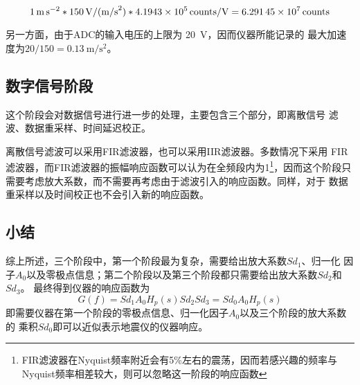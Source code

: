 \[
    \SI{1}{\m\per\square\s} *
    \SI{150}{\V\per{(\m\per\square\s)}} *
    \SI{4.1943e5}{counts\per\V} =
    \SI{6.29145e7}{counts}
\]

另一方面，由于ADC的输入电压的上限为 \SI{20}{\V}，因而仪器所能记录的
最大加速度为$20/150=\SI{0.13}{\m\per\square\s}$。

\subsection{数字信号阶段}
这个阶段会对数据信号进行进一步的处理，主要包含三个部分，即离散信号
滤波、数据重采样、时间延迟校正。

离散信号滤波可以采用FIR滤波器，也可以采用IIR滤波器。多数情况下采用
FIR滤波器，而FIR滤波器的振幅响应函数可以认为在全频段内为1\footnote{
FIR滤波器在Nyquist频率附近会有5\%左右的震荡，因而若感兴趣的频率与
Nyquist频率相差较大，则可以忽略这一阶段的响应函数}，因而这个阶段只
需要考虑放大系数，而不需要再考虑由于滤波引入的响应函数。同样，对于
数据重采样以及时间校正也不会引入新的响应函数。

\subsection{小结}
综上所述，三个阶段中，第一个阶段最为复杂，需要给出放大系数$Sd_{1}$、归一化
因子$A_0$以及零极点信息；第二个阶段以及第三个阶段都只需要给出放大系数$Sd_{2}$和$Sd_3$。
最终得到仪器的响应函数为
\[
    G(f)=Sd_1 A_0 H_p(s) Sd_2 Sd_3=Sd_0 A_0 H_p(s)
\]
即需要仪器在第一个阶段的零极点信息、归一化因子$A_0$以及三个阶段的放大系数的
乘积$Sd_0$即可以近似表示地震仪的仪器响应。
